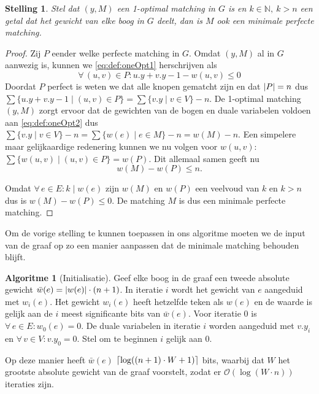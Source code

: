 \documentclass[conference]{IEEEtran}
\newtheorem{theorem}{Stelling}[section]
\theoremstyle{definition}
\newtheorem{algorithmm}{Algoritme}[section]
\theoremstyle{remark}
\DeclarePairedDelimiter{\ceil}{\lceil}{\rceil}
\DeclarePairedDelimiter{\abs}{\vert}{\vert}  %
\DeclarePairedDelimiter{\card}{\vert}{\vert}  %
\let \oldforall \forall
\renewcommand{\forall}{\oldforall\,}
\begin{document}
\begin{theorem}
    Stel dat $(y, M)$ een 1-optimal matching in $G$ is en $k \in \mathbb{N},\ k > n$ een getal dat het gewicht van elke boog in $G$ deelt, dan is $M$ ook een minimale perfecte matching.
\end{theorem}
\begin{proof}
    Zij $P$ eender welke perfecte matching in $G$. Omdat $(y, M)$ al in $G$ aanwezig is, kunnen we \eqref{eq:def:oneOpt1} herschrijven als
    \begin{equation*}
        \forall (u, v) \in P: u.y + v.y - 1 - w(u, v) \leq 0
    \end{equation*}
    Doordat $P$ perfect is weten we dat alle knopen gematcht zijn en dat $\card{P} = n$ dus $\sum\{u.y + v.y - 1 \mid (u, v) \in P\} = \sum\{v.y \mid v \in V\} - n$. De 1-optimal matching $(y, M)$ zorgt ervoor dat de gewichten van de bogen en duale variabelen voldoen aan \eqref{eq:def:oneOpt2} dus $\sum\{v.y \mid v \in V\} - n = \sum\{w(e) \mid e \in M\} - n = w(M) - n$. Een simpelere maar gelijkaardige redenering kunnen we nu volgen voor $w(u, v)$: $\sum\{w(u, v) \mid (u, v) \in P\} = w(P)$. Dit allemaal samen geeft nu
    \begin{equation*}
        w(M) - w(P) \leq n.
    \end{equation*}
    
    Omdat $\forall e \in E: k \mid w(e)$ zijn $w(M)$ en $w(P)$ een veelvoud van $k$ en $k > n$ dus is $w(M) - w(P) \leq 0$. De matching $M$ is dus een minimale perfecte matching.
\end{proof}

Om de vorige stelling te kunnen toepassen in ons algoritme moeten we de input van de graaf op zo een manier aanpassen dat de minimale matching behouden blijft.

\begin{algorithmm}[Initialisatie]
    Geef elke boog in de graaf een tweede absolute gewicht $\bar{w}(e) = \abs{w(e)} \cdot (n+1)$. In iteratie $i$ wordt het gewicht van $e$ aangeduid met $w_i(e)$. Het gewicht $w_i(e)$ heeft hetzelfde teken als $w(e)$ en de waarde is gelijk aan de $i$ meest significante bits van $\bar{w}(e)$. Voor iteratie $0$ is $\forall e \in E: w_0(e) = 0$. De duale variabelen in iteratie $i$ worden aangeduid met $v.y_i$ en $\forall v \in V: v.y_0 = 0$. Stel om te beginnen $i$ gelijk aan $0$.
\end{algorithmm}

Op deze manier heeft $\bar{w}(e)$ $\ceil{\log((n+1) \cdot W + 1)}$ bits, waarbij dat $W$ het grootste absolute gewicht van de graaf voorstelt, zodat er $\mathcal{O}(\log(W \cdot n))$ iteraties zijn.
\end{document}
